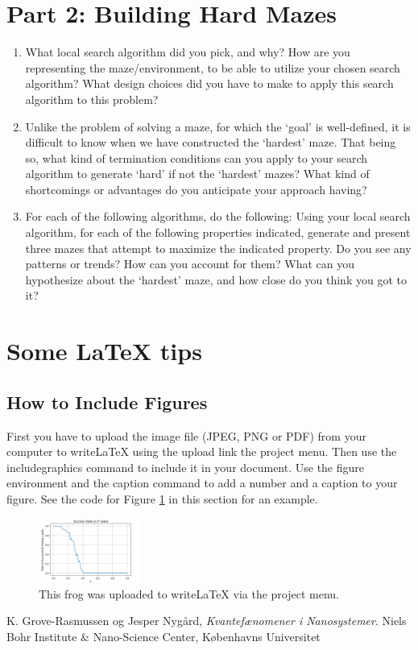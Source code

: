 \documentclass[letter]{article}
\begin{document}
\section{Part 2: Building Hard Mazes}
\label{sec:Part 2: Building Hard Mazes}
\begin{enumerate}[resume]
	
	\item {What local search algorithm did you pick, and why? How are you representing the maze/environment, to be able to utilize your chosen search algorithm? What design choices did you have to make to apply this search algorithm to this problem?}
	
	\item {Unlike the problem of solving a maze, for which the ‘goal’ is well-defined, it is difficult to know when we have constructed the ‘hardest’ maze. That being so, what kind of termination conditions can you apply to your search algorithm to generate ‘hard’ if not the ‘hardest’ mazes? What kind of shortcomings or advantages do you anticipate your approach having?}
	
	\item {For each of the following algorithms, do the following: Using your local search algorithm, for each of the following properties indicated, generate and present three mazes that attempt to maximize the indicated property. Do you see any patterns or trends? How can you account for them? What can you hypothesize about the ‘hardest’ maze, and how close do you think you got to it?}
\end{enumerate}

\section{Some LaTeX tips}
\label{sec:latex}
\subsection{How to Include Figures}

First you have to upload the image file (JPEG, PNG or PDF) from your computer to writeLaTeX using the upload link the project menu. Then use the includegraphics command to include it in your document. Use the figure environment and the caption command to add a number and a caption to your figure. See the code for Figure \ref{fig:frog} in this section for an example.

\begin{figure}
\centering
\includegraphics[width=0.3\textwidth]{../pics/question3-1.png}
\caption{\label{fig:frog}This frog was uploaded to writeLaTeX via the project menu.}
\end{figure}

\begin{thebibliography}{9}
  K. Grove-Rasmussen og Jesper Nygård,
  \emph{Kvantefænomener i Nanosystemer}.
  Niels Bohr Institute \& Nano-Science Center, Københavns Universitet

\end{thebibliography}
\end{document}
